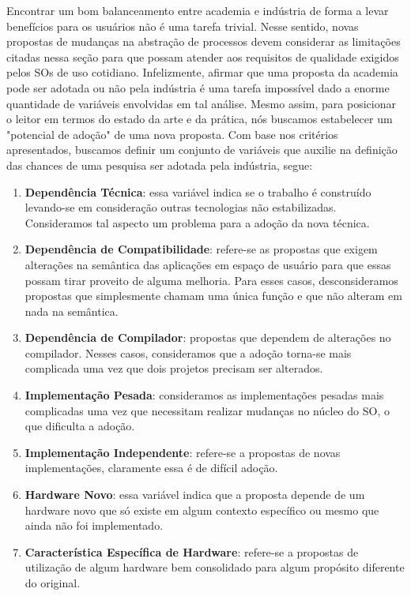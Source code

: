 Encontrar um bom balanceamento entre academia e indústria de forma a levar
benefícios para os usuários não é uma tarefa trivial. Nesse sentido, novas
propostas de mudanças na abstração de processos devem considerar as limitações
citadas nessa seção para que possam atender aos requisitos de qualidade
exigidos pelos SOs de uso cotidiano. Infelizmente, afirmar que uma proposta da
academia pode ser adotada ou não pela indústria é uma tarefa impossível dado a
enorme quantidade de variáveis envolvidas em tal análise. Mesmo assim, para
posicionar o leitor em termos do estado da arte e da prática, nós buscamos
estabelecer um "potencial de adoção" de uma nova proposta. Com base nos
critérios apresentados, buscamos definir um conjunto de variáveis que auxilie
na definição das chances de uma pesquisa ser adotada pela indústria, segue:

\begin{enumerate}
  \item
\textbf{Dependência Técnica}: essa variável indica se o trabalho é construído
levando-se em consideração outras tecnologias não estabilizadas. Consideramos
tal aspecto um problema para a adoção da nova técnica.

  \item
\textbf{Dependência de Compatibilidade}: refere-se as propostas que exigem
alterações na semântica das aplicações em espaço de usuário para que essas
possam tirar proveito de alguma melhoria. Para esses casos, desconsideramos
propostas que simplesmente chamam uma única função e que não alteram em nada
na semântica.

  \item
\textbf{Dependência de Compilador}: propostas que dependem de alterações no
compilador. Nesses casos, consideramos que a adoção torna-se mais complicada
uma vez que dois projetos precisam ser alterados.

  \item
\textbf{Implementação Pesada}: consideramos as implementações pesadas mais
complicadas uma vez que necessitam realizar mudanças no núcleo do SO, o que
dificulta a adoção.

  \item
\textbf{Implementação Independente}: refere-se a propostas de novas
implementações, claramente essa é de difícil adoção.

  \item
\textbf{Hardware Novo}: essa variável indica que a proposta depende de um
hardware novo que só existe em algum contexto específico ou mesmo que ainda não
foi implementado.

  \item
\textbf{Característica Específica de Hardware}: refere-se a propostas de
utilização de algum hardware bem consolidado para algum propósito diferente do
original.

\end{enumerate}

